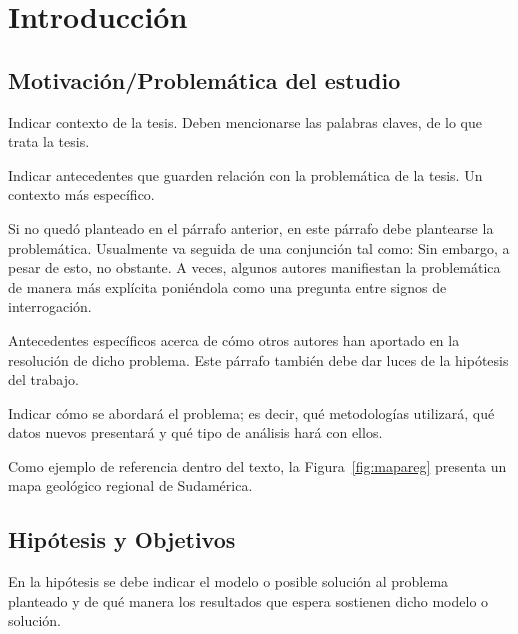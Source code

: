 \chapter{Introducción}

\section{Motivación/Problemática del estudio}

       Indicar contexto de la tesis. Deben mencionarse las palabras claves, de lo que trata la tesis.\par
  
       Indicar antecedentes que guarden relación con la problemática de la tesis. Un contexto más específico.\par
       

       Si no quedó planteado en el párrafo anterior, en este párrafo debe plantearse la problemática. Usualmente va seguida de una conjunción tal como: Sin embargo, a pesar de esto, no obstante. A veces, algunos autores manifiestan la problemática de manera más explícita poniéndola como una pregunta entre signos de interrogación.\par
 
       Antecedentes específicos acerca de cómo otros autores han aportado en la resolución de dicho problema. Este párrafo también debe dar luces de la hipótesis del trabajo.\par

       Indicar cómo se abordará el problema; es decir, qué metodologías utilizará, qué datos nuevos presentará y qué tipo de análisis hará con ellos.

       Como ejemplo de referencia dentro del texto, la Figura~\ref{fig:mapareg}
       presenta un mapa geológico regional de Sudamérica.

           
            
\section{Hipótesis y Objetivos}
    
       En la hipótesis se debe indicar el modelo o posible solución al problema planteado y de qué manera los resultados que espera sostienen dicho modelo o solución. \par
     
